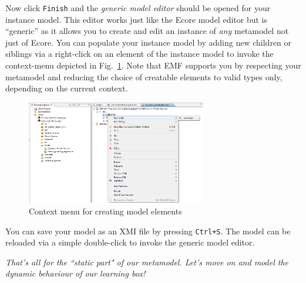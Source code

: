 Now click \texttt{Finish} and the \emph{generic model editor} should be opened
for your instance model. 
This editor works just like the Ecore model editor but is ``generic'' as it
allows you to create and edit an instance of \emph{any} metamodel not just of
Ecore.
You can populate your instance model by adding new children or siblings via a
right-click on an element of the instance model to invoke the context-menu
depicted in Fig.~\ref{fig:create_instance}.
Note that EMF supports you by respecting your metamodel and reducing the choice
of creatable elements to valid types only, depending on the current context. 

\begin{figure}[htbp]
	\centering 
  \includegraphics[width=0.7\textwidth]{pics/modelBrowserBilder/adjustModel.png} 
	\caption{Context menu for creating model elements}
	\label{fig:create_instance}
\end{figure}

You can save your model as an XMI file by pressing \texttt{Ctrl+S}.
The model can be reloaded via a simple double-click to invoke the generic model
editor. 

\textsl{That's all for the ``static part" of our metamodel. Let's move on and
model the dynamic behaviour of our learning box!}

